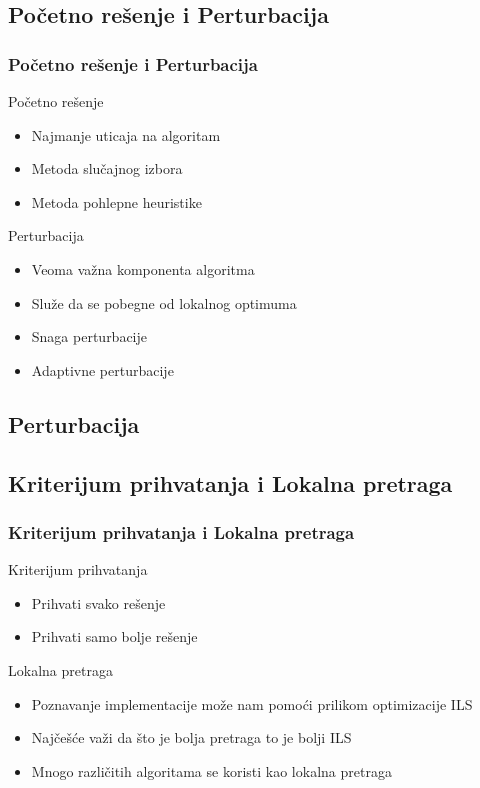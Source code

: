 \documentclass{beamer}
\begin{document}
\subsection{Početno rešenje i Perturbacija}
\begin{frame}[fragile]\frametitle{Početno rešenje i Perturbacija}
  Početno rešenje
  \begin{itemize}
    \item Najmanje uticaja na algoritam
    \item Metoda slučajnog izbora
    \item Metoda pohlepne heuristike
  \end{itemize}
  Perturbacija
  \begin{itemize}
    \item Veoma važna komponenta algoritma
    \item Služe da se pobegne od lokalnog optimuma
    \item Snaga perturbacije
    \item Adaptivne perturbacije
  \end{itemize}
	\subsection{Perturbacija}

\end{frame}




\subsection{Kriterijum prihvatanja i Lokalna pretraga}
\begin{frame}[fragile]\frametitle{Kriterijum prihvatanja i Lokalna pretraga}
	Kriterijum prihvatanja
  \begin{itemize}
    \item Prihvati svako rešenje
    \item Prihvati samo bolje rešenje
  \end{itemize}
  Lokalna pretraga
  \begin{itemize}
    \item Poznavanje implementacije može nam pomoći prilikom optimizacije ILS
    \item Najčešće važi da što je bolja pretraga to je bolji ILS
    \item Mnogo različitih algoritama se koristi kao lokalna pretraga
  \end{itemize}
\end{frame}
\end{document}
